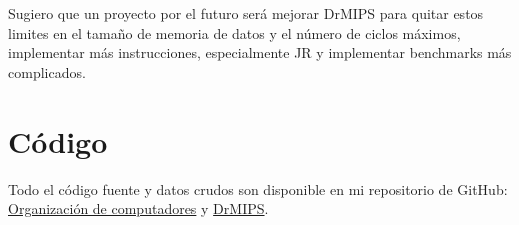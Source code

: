 \documentclass[a4paper]{article}
\begin{document}
Sugiero que un proyecto por el futuro será mejorar DrMIPS para quitar estos limites en el tamaño de memoria de datos y el número de ciclos máximos, implementar más instrucciones, especialmente JR y implementar benchmarks más complicados.

\section{Código}

Todo el código fuente y datos crudos son disponible en mi repositorio de GitHub:  \href{https://github.com/andrewparlane/fiuba6620_orga_de_compus/tree/master/tpFinal}{Organización de computadores} y \href{https://github.com/andrewparlane/drmips}{DrMIPS}.
\end{document}
